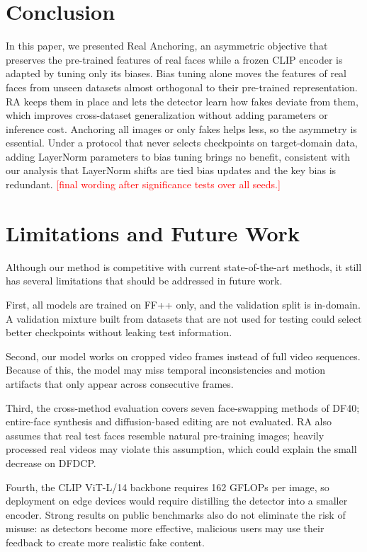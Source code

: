 \documentclass[fonts]{icst}
\newif\ifpending\pendingtrue
\newcommand{\pending}[1]{\ifpending\textcolor{red}{[#1]}\else\errmessage{pending text left: #1}\fi}
\begin{document}
\section{Conclusion}

In this paper, we presented Real Anchoring, an asymmetric objective that preserves the pre-trained features of real faces while a frozen CLIP encoder is adapted by tuning only its biases.
Bias tuning alone moves the features of real faces from unseen datasets almost orthogonal to their pre-trained representation. RA keeps them in place and lets the detector learn how fakes deviate from them, which improves cross-dataset generalization without adding parameters or inference cost. Anchoring all images or only fakes helps less, so the asymmetry is essential.
Under a protocol that never selects checkpoints on target-domain data, adding LayerNorm parameters to bias tuning brings no benefit, consistent with our analysis that LayerNorm shifts are tied bias updates and the key bias is redundant. \pending{final wording after significance tests over all seeds.}


\section{Limitations and Future Work}
\label{sec:limits}
Although our method is competitive with current state-of-the-art methods, it still has several limitations that should be addressed in future work.

First, all models are trained on FF++ only, and the validation split is in-domain. A validation mixture built from datasets that are not used for testing could select better checkpoints without leaking test information.

Second, our model works on cropped video frames instead of full video sequences.
Because of this, the model may miss temporal inconsistencies and motion artifacts that only appear across consecutive frames.

Third, the cross-method evaluation covers seven face-swapping methods of DF40; entire-face synthesis and diffusion-based editing are not evaluated. RA also assumes that real test faces resemble natural pre-training images; heavily processed real videos may violate this assumption, which could explain the small decrease on DFDCP.

Fourth, the CLIP ViT-L/14 backbone requires 162 GFLOPs per image, so deployment on edge devices would require distilling the detector into a smaller encoder. Strong results on public benchmarks also do not eliminate the risk of misuse: as detectors become more effective, malicious users may use their feedback to create more realistic fake content.
\end{document}
